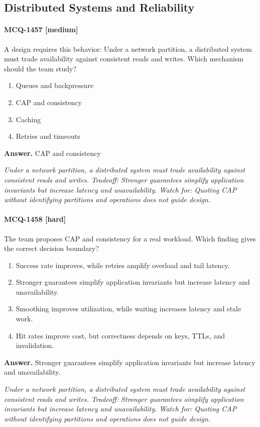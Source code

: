 \subsection{Distributed Systems and Reliability}
\paragraph{MCQ-1457 [medium]} A design requires this behavior: Under a network partition, a distributed system must trade availability against consistent reads and writes. Which mechanism should the team study?
\begin{enumerate}[label=\Alph*.]
\item Queues and backpressure
\item CAP and consistency
\item Caching
\item Retries and timeouts
\end{enumerate}
\noindent\textbf{Answer.} CAP and consistency
\par\textit{Under a network partition, a distributed system must trade availability against consistent reads and writes. Tradeoff: Stronger guarantees simplify application invariants but increase latency and unavailability. Watch for: Quoting CAP without identifying partitions and operations does not guide design.}
\paragraph{MCQ-1458 [hard]} The team proposes CAP and consistency for a real workload. Which finding gives the correct decision boundary?
\begin{enumerate}[label=\Alph*.]
\item Success rate improves, while retries amplify overload and tail latency.
\item Stronger guarantees simplify application invariants but increase latency and unavailability.
\item Smoothing improves utilization, while waiting increases latency and stale work.
\item Hit rates improve cost, but correctness depends on keys, TTLs, and invalidation.
\end{enumerate}
\noindent\textbf{Answer.} Stronger guarantees simplify application invariants but increase latency and unavailability.
\par\textit{Under a network partition, a distributed system must trade availability against consistent reads and writes. Tradeoff: Stronger guarantees simplify application invariants but increase latency and unavailability. Watch for: Quoting CAP without identifying partitions and operations does not guide design.}
